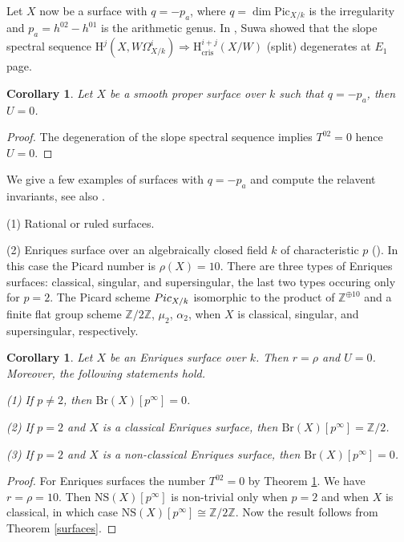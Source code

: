 \documentclass[a4paper,12pt,twoside]{report}
\newtheorem{corollary}[theorem]{Corollary}
\newcommand{\Z}{\mathbb{Z}}
\newcommand{\cris}{\mathrm{cris}}
\newcommand{\Pic}{\mathrm{Pic}}
\newcommand{\Br}{\mathrm{Br}}
\newcommand{\NS}{\mathrm{NS}}
\newcommand{\HH}{\mathrm{H}}
\begin{document}
\medskip

Let $X$ now be a surface with $q=-p_a$, 
where $q=\dim \Pic_{X/k}$ is the irregularity and $p_a=h^{02}-h^{01}$ is the arithmetic genus. 
In \cite[Corollary 5]{Su}, Suwa showed that the slope spectral sequence 
$\HH^j(X,W\Omega_{X/k}^i)\Rightarrow \HH^{i+j}_{\cris}(X/W)$ (split) degenerates at $E_1$ page. 


\begin{corollary}\label{qpa}
    Let $X$ be a smooth proper surface over $k$ such that $q=-p_a$, then $U=0$. 
\end{corollary}

\begin{proof}
The degeneration of the slope spectral sequence implies $T^{02}=0$ hence $U=0$. 
\end{proof} 

We give a few examples of surfaces with $q=-p_a$ and compute the relavent invariants, see also \cite{Su}. 

(1) Rational or ruled surfaces.  

(2) Enriques surface over an algebraically closed field
$k$ of characteristic $p$ (\cite[Section 3-5]{BM3}). In this case the Picard number is $\rho(X)=10$.
There are three types of Enriques surfaces: classical, singular, and supersingular,
the last two types occuring only for $p=2$.
The Picard scheme ${\rm Pic}_{X/k}$ isomorphic to
the product of $\Z^{\oplus 10}$ and a finite flat group scheme
$\Z/2\Z$, $\mu_2$, $\alpha_2$, when $X$ is classical, singular, and supersingular, respectively. 


\begin{corollary}\label{Enriques}
    Let $X$ be an Enriques surface over $k$. Then $r=\rho$ and $U=0$. Moreover, 
the following statements hold.

{\rm    (1)} If $p\neq 2$, then $\Br(X)[p^{\infty}]=0$.

{\rm    (2)} If $p=2$ and $X$ is a classical Enriques surface, then $\Br(X)[p^{\infty}]=\Z/2$.

{\rm    (3)} If $p=2$ and $X$ is a non-classical Enriques surface, then $\Br(X)[p^{\infty}]=0$.
\end{corollary}
\begin{proof}
    For Enriques surfaces the number $T^{02}=0$ by Theorem \ref{qpa}. We have $r=\rho=10$. 
    Then $\NS(X)[p^{\infty}]$ is non-trivial only when $p=2$ and when $X$ is classical, in which case $\NS(X)[p^{\infty}]\cong \Z/2\Z$. 
    Now the result follows from Theorem \ref{surfaces}. 
\end{proof}
\end{document}
